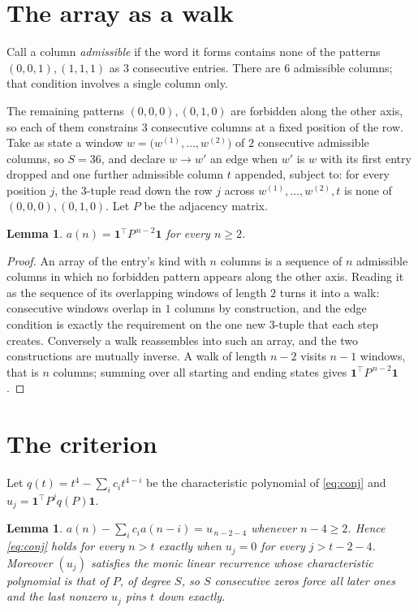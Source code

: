 \documentclass[11pt,a4paper]{article}
\theoremstyle{plain}
\newtheorem{lemma}[theorem]{Lemma}
\theoremstyle{definition}
\begin{document}
\section{The array as a walk}

Call a column \emph{admissible} if the word it forms contains none of the patterns
$(0,0,1), (1,1,1)$ as $3$ consecutive entries. There are $6$ admissible columns; that condition
involves a single column only.

The remaining patterns $(0,0,0), (0,1,0)$ are forbidden along the other axis, so each of them
constrains $3$ consecutive columns at a fixed position of the row. Take as state a
window $w=\bigl(w^{(1)},\dots,w^{(2)}\bigr)$ of $2$ consecutive admissible
columns, so $S=36$, and declare $w\to w'$ an edge when $w'$ is $w$ with its first entry
dropped and one further admissible column $t$ appended, subject to: for every position
$j$, the $3$-tuple read down the row $j$ across $w^{(1)},\dots,w^{(2)},t$
is none of $(0,0,0), (0,1,0)$. Let $P$ be the adjacency matrix.

\begin{lemma}\label{lem:walk}
$a(n)=\mathbf{1}^{\!\top}P^{\,n-2}\mathbf{1}$ for every $n\ge2$.
\end{lemma}

\begin{proof}
An array of the entry's kind with $n$ columns is a sequence of $n$ admissible columns in
which no forbidden pattern appears along the other axis. Reading it as the sequence of its
overlapping windows of length $2$ turns it into a walk: consecutive windows overlap in
$1$ columns by construction, and the edge condition is exactly the requirement on the one
new $3$-tuple that each step creates. Conversely a walk reassembles into such an array,
and the two constructions are mutually inverse. A walk of length $n-2$ visits $n-1$
windows, that is $n$ columns; summing over all starting and ending states gives
$\mathbf{1}^{\!\top}P^{\,n-2}\mathbf{1}$.
\end{proof}

\section{The criterion}

Let $q(t)=t^{4}-\sum_i c_i t^{4-i}$ be the characteristic polynomial of
\eqref{eq:conj} and $u_j=\mathbf{1}^{\!\top}P^{j}q(P)\mathbf{1}$.

\begin{lemma}\label{lem:crit}
$a(n)-\sum_i c_i a(n-i)=u_{\,n-2-4}$ whenever $n-4\ge2$. Hence
\eqref{eq:conj} holds for every $n>t$ exactly when $u_j=0$ for every
$j>t-2-4$. Moreover $(u_j)$ satisfies the monic linear recurrence whose
characteristic polynomial is that of $P$, of degree $S$, so $S$ consecutive zeros force all
later ones and the last nonzero $u_j$ pins $t$ down exactly.
\end{lemma}
\end{document}

